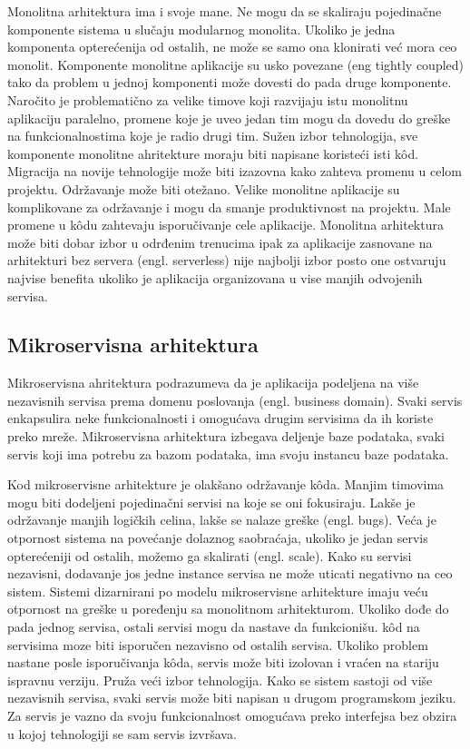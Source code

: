 \documentclass[12pt,oneside]{memoir}
\begin{document}
Monolitna arhitektura ima i svoje mane. Ne mogu da se skaliraju pojedinačne komponente sistema u slučaju modularnog monolita. Ukoliko je jedna komponenta opterećenija od ostalih, ne može se samo ona klonirati već mora ceo monolit. Komponente monolitne aplikacije su usko povezane (eng tightly coupled) tako da problem u jednoj komponenti može dovesti do pada druge komponente. Naročito je problematično za velike timove koji razvijaju istu monolitnu aplikaciju paralelno, promene koje je uveo jedan tim mogu da dovedu do greške na funkcionalnostima koje je radio drugi tim. Sužen izbor tehnologija, sve komponente monolitne ahritekture moraju biti napisane koristeći isti kôd. Migracija na novije tehnologije može biti izazovna kako zahteva promenu u celom projektu. Održavanje može biti otežano. Velike monolitne aplikacije su komplikovane za održavanje i mogu da smanje produktivnost na projektu. Male promene u kôdu zahtevaju isporučivanje cele aplikacije. Monolitna arhitektura može biti dobar izbor u odrđenim trenucima ipak za aplikacije zasnovane na arhitekturi bez servera (engl. serverless) nije najbolji izbor posto one ostvaruju najvise benefita ukoliko je aplikacija organizovana u vise manjih odvojenih servisa\cite{sa}.

\subsection{Mikroservisna arhitektura}
Mikroservisna ahritektura podrazumeva da je aplikacija podeljena na više nezavisnih servisa prema domenu poslovanja (engl. business domain)\cite{bm}. Svaki servis enkapsulira neke funkcionalnosti i omogućava drugim servisima da ih koriste preko mreže. Mikroservisna arhitektura izbegava deljenje baze podataka, svaki servis koji ima potrebu za bazom podataka, ima svoju instancu baze podataka. 

Kod mikroservisne arhitekture je olakšano održavanje kôda. Manjim timovima mogu biti dodeljeni pojedinačni servisi na koje se oni fokusiraju. Lakše je održavanje manjih logičkih celina, lakše se nalaze greške (engl. bugs). Veća je otpornost sistema na povećanje dolaznog saobraćaja, ukoliko je jedan servis opterećeniji od ostalih, možemo ga skalirati (engl. scale). Kako su servisi nezavisni, dodavanje jos jedne instance servisa ne može uticati negativno na ceo sistem. Sistemi dizarnirani po modelu mikroservisne arhitekture imaju veću otpornost na greške u poređenju sa monolitnom arhitekturom. Ukoliko dođe do pada jednog servisa, ostali servisi mogu da nastave da funkcionišu. kôd na servisima moze biti isporučen nezavisno od ostalih servisa. Ukoliko problem nastane posle isporučivanja kôda, servis može biti izolovan i vraćen na stariju ispravnu verziju. Pruža veći izbor tehnologija. Kako se sistem sastoji od više nezavisnih servisa, svaki servis može biti napisan u drugom programskom jeziku. Za servis je vazno da svoju funkcionalnost omogućava preko interfejsa bez obzira u kojoj tehnologiji se sam servis izvršava.
\end{document}
